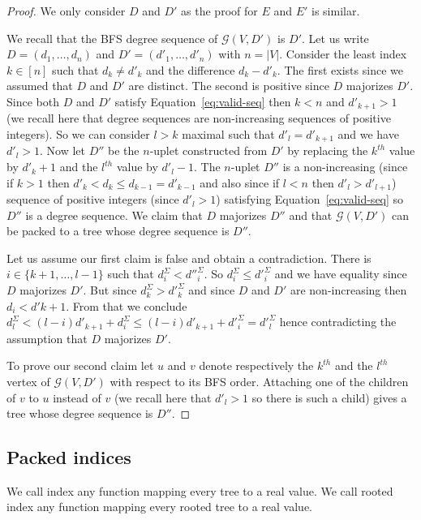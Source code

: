 \documentclass[11 pt]{modarticle}
\newcommand{\size}[1]{|#1|}
\newcommand{\greedy}[2]{\mathcal{G}(#1,#2)}
\begin{document}
\begin{proof}
We only consider $D$ and $D'$ as the proof for $E$ and $E'$ is similar.

We recall that the BFS degree sequence of $\greedy{V}{D'}$ is $D'$. Let us write $D = (d_1, \dots, d_n)$ and $D' = (d'_1, \dots, d'_n)$ with $n = \size{V}$. Consider the least index $k \in [n]$ such that $d_k \neq d'_k$ and the difference $d_k - d'_k$. The first exists since we assumed that $D$ and $D'$ are distinct. The second is positive since $D$ majorizes $D'$. Since both $D$ and $D'$ satisfy Equation~\eqref{eq:valid-seq} then $k < n$ and $d'_{k+1} > 1$ (we recall here that degree sequences are non-increasing sequences of positive integers). So we can consider $l > k$ maximal such that $d'_l = d'_{k+1}$ and we have $d'_l > 1$. Now let $D''$ be the $n$-uplet constructed from $D'$ by replacing the $k^{th}$ value by $d'_k+1$ and the $l^{th}$ value by $d'_l-1$. The $n$-uplet $D''$ is a non-increasing (since if $k > 1$ then $d'_k < d_k \leq d_{k-1} = d'_{k-1}$ and also since if $l < n$ then $d'_l > d'_{l+1}$) sequence of positive integers (since $d'_l > 1$) satisfying Equation~\eqref{eq:valid-seq} so $D''$ is a degree sequence. We claim that $D$ majorizes $D''$ and that $\greedy{V}{D'}$ can be packed to a tree whose degree sequence is $D''$.

Let us assume our first claim is false and obtain a contradiction. There is $i \in \{k+1, \dots, l-1\}$ such that $d^{\Sigma}_i < d''^{\Sigma}_i$. So $d^{\Sigma}_i \leq d'^{\Sigma}_i$ and we have equality since $D$ majorizes $D'$. But since $d^{\Sigma}_k > d'^{\Sigma}_k$ and since $D$ and $D'$ are non-increasing then $d_i < d'{k+1}$.  From that we conclude $d^{\Sigma}_l < (l-i) d'_{k+1} + d^{\Sigma}_i \leq (l-i) d'_{k+1} + d'^{\Sigma}_i = d'^{\Sigma}_l$ hence contradicting the assumption that $D$ majorizes $D'$. 

To prove our second claim let $u$ and $v$ denote respectively the $k^{th}$ and the $l^{th}$ vertex of $\greedy{V}{D'}$ with respect to its BFS order. Attaching one of the children of $v$ to $u$ instead of $v$ (we recall here that $d'_l > 1$ so there is such a child) gives a tree whose degree sequence is $D''$.
\end{proof}

\subsection{Packed indices}

We call index any function mapping every tree to a real value. We call rooted index any function mapping every rooted tree to a real value.
\end{document}
